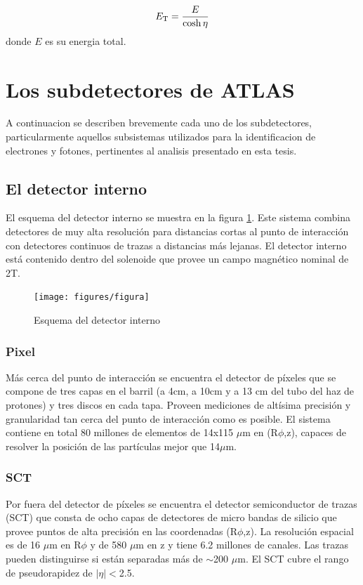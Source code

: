 \begin{equation}
  \et = \frac{E}{\cosh \eta}
\end{equation}
%
donde $E$ es su energia total.


\section{Los subdetectores de ATLAS}

A continuacion se describen brevemente cada uno de los subdetectores, particularmente
aquellos subsistemas utilizados para la identificacion de electrones y fotones, pertinentes
al analisis presentado en esta tesis.

\subsection{El detector interno}

El esquema del detector interno se muestra en la figura \ref{fig:innerdetector}\cite{IDTDR}.
Este sistema combina detectores de muy alta resolución para distancias cortas al punto de interacción con detectores continuos de trazas a distancias más lejanas. El detector interno está contenido dentro del solenoide que provee un campo magnético nominal de 2T.

\begin{figure}[H]
  \centering
  \texttt{[image: figures/figura]}
  \caption{Esquema del detector interno}\label{fig:innerdetector}
\end{figure}

\subsubsection{Pixel}
Más cerca del punto de interacción se encuentra el detector de píxeles que se compone de tres capas en el barril (a 4cm, a 10cm y a 13 cm del tubo del haz de protones) y tres discos en cada tapa.  Proveen mediciones de altísima precisión y granularidad tan cerca del punto de interacción como es posible. El sistema contiene en total 80 millones de elementos de 14x115 $\mu$m en (R$\phi$,z), capaces de resolver la posición de las partículas mejor que 14$\mu$m.

\subsubsection{SCT}
Por fuera del detector de píxeles se encuentra el detector semiconductor de trazas (SCT) que consta de ocho capas de detectores de micro bandas de silicio que provee puntos de alta precisión en las coordenadas (R$\phi$,z).
La resolución espacial es de 16 $\mu$m en R$\phi$ y de 580 $\mu$m en z y tiene 6.2 millones de canales.
Las trazas pueden distinguirse si están separadas más de $\sim$200 $ \mu$m.
El SCT cubre el rango de pseudorapidez de $|\eta|<$2.5.


